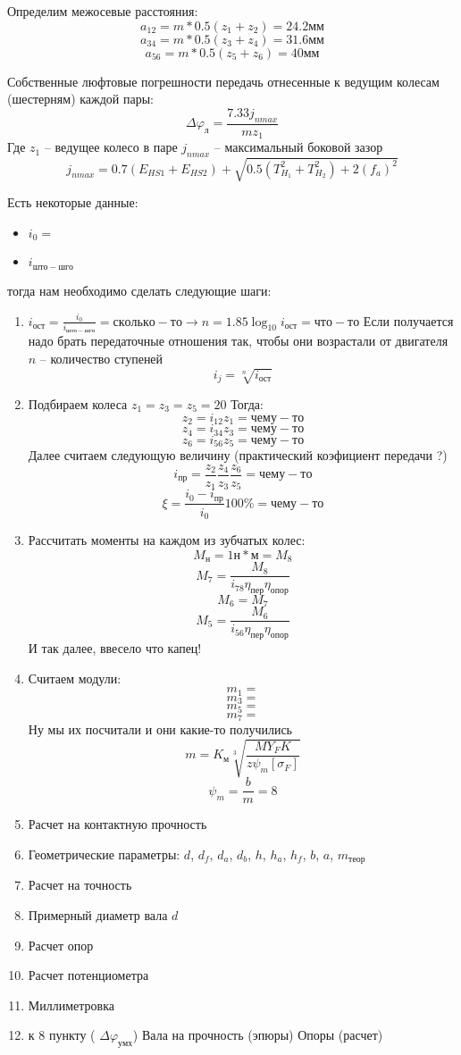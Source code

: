 \documentclass{article}
\begin{document}
\begin{enumerate}
	Определим межосевые расстояния:
	$$
	a_{12} = m * 0.5 (z_1 + z_2) = 24.2 мм
	$$
	$$
	a_{34} = m * 0.5 (z_3 + z_4) = 31.6 мм
	$$
	$$
	a_{56} = m * 0.5 (z_5 + z_6) = 40 мм
	$$

	Собственные люфтовые погрешности передачь отнесенные к ведущим колесам (шестерням) каждой пары:
	$$
	\Delta\varphi_л = \frac{7.33 j_{n max}}{m z_1}
	$$
	Где $z_1$ -- ведущее колесо в паре
	$j_{n max}$ -- максимальный боковой зазор
	$$
	j_{n max} = 0.7 (E_{HS1} + E_{HS2}) + \sqrt {0.5 (T_{H_1}^2 + T_{H_2}^2) + 2 (f_a)^2}	
	$$
\end{enumerate}

Есть некоторые данные:
\begin{itemize}
	\item $i_0 =$
	\item $i_{што-шго}$
\end{itemize}
тогда нам необходимо сделать следующие шаги:

\begin{enumerate}
	\item $i_{ост} = \frac{i_0}{i_{што-шго}} = сколько-то \to n = 1.85 \log_{10} i_{ост} = что-то$
	Если получается надо брать передаточные отношения так, чтобы они возрастали от двигателя
	$n$ -- количество ступеней
	$$
	i_j = \sqrt[n] {i_{ост}}
	$$
	\item Подбираем колеса $z_1 = z_3 = z_5 = 20$
	Тогда:
	$$
	z_2 = i_{12} z_1 = чему-то
	$$
	$$
	z_4 = i_{34} z_3 = чему-то
	$$
	$$
	z_6 = i_{56} z_5 = чему-то
	$$
	Далее считаем следующую величину (практический коэфициент передачи ?)
	$$
	i_{пр} = \frac{z_2}{z_1} \frac{z_4}{z_3} \frac{z_6}{z_5} = чему-то
	$$
	$$
	\xi = \frac{i_0 - i_{пр}}{i_0} 100 \% = чему-то
	$$
	\item Рассчитать моменты на каждом из зубчатых колес:
	$$
	M_н = 1 н * м = M_8
	$$
	$$
	M_7 = \frac{M_8}{i_{78} \eta_{пер} \eta_{опор}} 
	$$
	$$
	M_6 = M_7
	$$
	$$
	M_5 = \frac{M_6}{i_{56} \eta_{пер} \eta_{опор}} 
	$$
	И так далее, ввесело что капец!
	\item Считаем модули:
	$$
	m_1 =
	$$
	$$
	m_3 =
	$$
	$$
	m_5 =
	$$
	$$
	m_7 = 
	$$
	Ну мы их посчитали и они какие-то получились
	$$
	m = K_м \sqrt[3] { \frac{M Y_F K}{z \psi_m [ \sigma_F]}} 
	$$
	$$
	\psi_m = \frac{b}{m} = 8
	$$
	\item Расчет на контактную прочность
	\item Геометрические параметры:
	$d$, $d_f$, $d_a$, $d_b$, $h$, $h_a$, $h_f$, $b$, $a$, $m_{теор}$
	\item Расчет на точность
	\item Примерный диаметр вала $d$
	\item Расчет опор
	\item Расчет потенциометра
	\item Миллиметровка
	\item к 8 пункту ( $ \Delta \varphi_{умх}$) Вала на прочность (эпюры) Опоры (расчет)
\end{enumerate}
\end{document}
